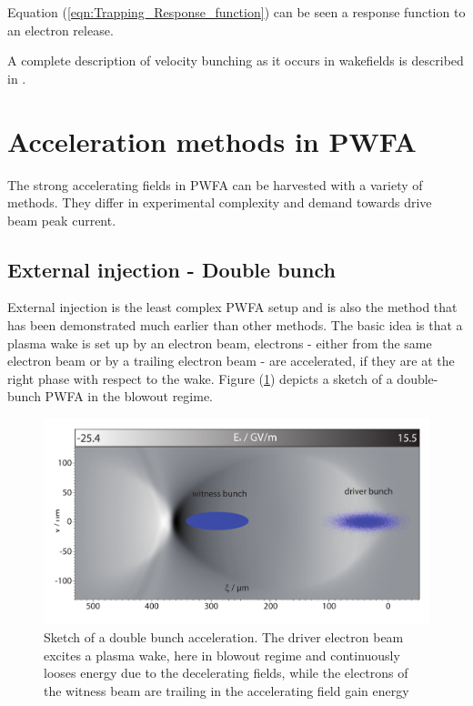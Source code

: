 Equation (\ref{eqn:Trapping_Response_function}) can be seen a response function to an electron release. 



A complete description of velocity bunching as it occurs in wakefields is described in
\cite{AndersonVelocBunchPPRSTAB2005,serafini2001velocity}.

\section{Acceleration methods in PWFA}
The strong accelerating fields in PWFA can be harvested with a variety of methods. They differ in experimental complexity and demand towards drive beam peak current.



\subsection{External injection - Double bunch}
External injection is the least complex PWFA setup and is also the method that has been demonstrated much earlier than other methods. The basic idea is that a plasma wake is set up by an electron beam, electrons - either from the same electron beam or by a trailing electron beam - are accelerated, if they are at the right phase with respect to the wake.
Figure (\ref{img:DoubleBunch}) depicts a sketch of a double-bunch PWFA in the blowout regime.
\begin{figure}[h]
\begin{center}
\includegraphics[width=1.0\textwidth]{simulations/images/edited/DoubleBunch.pdf}
\end{center}
\caption{Sketch of a double bunch acceleration. The driver electron beam excites a plasma wake, here in blowout regime and continuously looses energy due to the decelerating fields, while the electrons of the witness beam are trailing in the accelerating field gain energy}
\label{img:DoubleBunch}
\end{figure}

